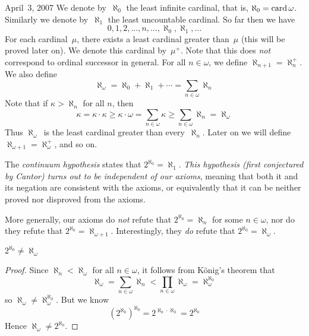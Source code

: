 \begin{lecture}{April~3, 2007}
We denote by~\(\aleph_0\) the least infinite cardinal, that is, \(\aleph_0=\operatorname{card}\omega\). Similarly we denote by~\(\aleph_1\) the least uncountable cardinal. So far then we have
\[0,1,2,\ldots,n,\ldots,\aleph_0,\aleph_1,\ldots\]
For each cardinal~\(\mu\), there exists a least cardinal greater than~\(\mu\) (this will be proved later on). We denote this cardinal by~\(\mu^+\). Note that this does \emph{not} correspond to ordinal successor in general. For all \(n\in\omega\), we define \(\aleph_{n+1}=\aleph_n^+\). We also define
\[\aleph_{\omega}=\aleph_0+\aleph_1+\cdots=\sum_{n\in\omega}\aleph_n\]
Note that if \(\kappa>\aleph_n\) for all \(n\), then
\[\kappa=\kappa\cdot\kappa\ge\kappa\cdot\omega=\sum_{n\in\omega}\kappa\ge\sum_{n\in\omega}\aleph_n=\aleph_{\omega}\]
Thus \(\aleph_{\omega}\)~is the least cardinal greater than every~\(\aleph_n\). Later on we will define \(\aleph_{\omega+1}=\aleph_{\omega}^+\), and so on.

The \emph{continuum hypothesis} states that \(2^{\aleph_0}=\aleph_1\). \emph{This hypothesis (first conjectured by Cantor) turns out to be independent of our axioms}, meaning that both it and its negation are consistent with the axioms, or equivalently that it can be neither proved nor disproved from the axioms.

More generally, our axioms do \emph{not} refute that \(2^{\aleph_0}=\aleph_n\) for some \(n\in\omega\), nor do they refute that \(2^{\aleph_0}=\aleph_{\omega+1}\). Interestingly, they \emph{do} refute that \(2^{\aleph_0}=\aleph_{\omega}\).
\begin{thm}
\(2^{\aleph_0}\ne\aleph_{\omega}\)
\end{thm}
\begin{proof}
Since \(\aleph_n<\aleph_{\omega}\) for all \(n\in\omega\), it follows from K\"onig's theorem that
\[\aleph_{\omega}=\sum_{n\in\omega}\aleph_n<\prod_{n\in\omega}\aleph_{\omega}=\aleph_{\omega}^{\aleph_0}\]
so \(\aleph_{\omega}\ne\aleph_{\omega}^{\aleph_0}\). But we know
\[(2^{\aleph_0})^{\aleph_0}=2^{\aleph_0\cdot\aleph_0}=2^{\aleph_0}\]
Hence \(\aleph_{\omega}\ne 2^{\aleph_0}\).
\end{proof}
\end{lecture}
